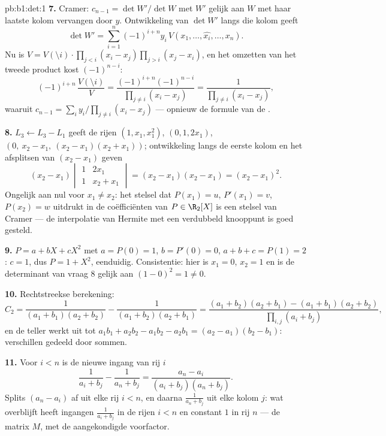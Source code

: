 \begin{solution}{pb:b1:det:1}
\textbf{7.} Cramer: $c_{n-1} = \det W'/\det W$ met $W'$ gelijk aan
$W$ met haar laatste kolom vervangen door $y$. Ontwikkeling van
$\det W'$ langs die kolom geeft
\[
\det W' = \sum_{i=1}^n (-1)^{i+n} y_i\,V(x_1, \dots, \widehat{x_i},
\dots, x_n) .
\]
Nu is $V = V(\setminus i)\cdot\prod_{j<i}(x_i - x_j)\prod_{j>i}
(x_j - x_i)$, en het omzetten van het tweede product kost
$(-1)^{n-i}$:
\[
(-1)^{i+n}\,\frac{V(\setminus i)}{V}
= \frac{(-1)^{i+n}(-1)^{n-i}}{\prod_{j\neq i}(x_i - x_j)}
= \frac{1}{\prod_{j\neq i}(x_i - x_j)} ,
\]
waaruit $c_{n-1} = \sum_i y_i/\prod_{j \neq i}(x_i - x_j)$ ---
opnieuw de formule van de .

\textbf{8.} $L_3 \leftarrow L_3 - L_1$ geeft de rijen $(1, x_1,
x_1^2)$, $(0, 1, 2x_1)$, $(0,\ x_2 - x_1,\
(x_2-x_1)(x_2+x_1))$; ontwikkeling langs de eerste kolom en het
afsplitsen van $(x_2 - x_1)$ geven
\[
(x_2 - x_1)\begin{vmatrix} 1 & 2x_1\\ 1 & x_2 + x_1
\end{vmatrix} = (x_2 - x_1)(x_2 - x_1) = (x_2 - x_1)^2 .
\]
Ongelijk aan nul voor $x_1 \neq x_2$: het  stelsel dat
$P(x_1) = u$, $P'(x_1) = v$, $P(x_2) = w$ uitdrukt in de
coëfficiënten van $P \in \R_2[X]$ is een stelsel van Cramer --- de
interpolatie van Hermite met een verdubbeld knooppunt is goed
gesteld.

\textbf{9.} $P = a + bX + cX^2$ met $a = P(0) = 1$, $b = P'(0) =
0$, $a + b + c = P(1) = 2$: $c = 1$, dus $P = 1 + X^2$, eenduidig.
Consistentie: hier is $x_1 = 0$, $x_2 = 1$ en is de determinant van
vraag 8 gelijk aan $(1 - 0)^2 = 1 \neq 0$.

\textbf{10.} Rechtstreekse berekening:
\[
C_2 = \frac{1}{(a_1+b_1)(a_2+b_2)} - \frac{1}{(a_1+b_2)(a_2+b_1)}
= \frac{(a_1+b_2)(a_2+b_1) - (a_1+b_1)(a_2+b_2)}
{\prod_{i,j}(a_i+b_j)} ,
\]
en de teller werkt uit tot $a_1b_1 + a_2b_2 - a_1b_2 - a_2b_1 =
(a_2 - a_1)(b_2 - b_1)$: verschillen gedeeld door sommen.

\textbf{11.} Voor $i < n$ is de nieuwe ingang van rij $i$
\[
\frac{1}{a_i + b_j} - \frac{1}{a_n + b_j}
= \frac{a_n - a_i}{(a_i + b_j)(a_n + b_j)} .
\]
Splits $(a_n - a_i)$ af uit elke rij $i < n$, en daarna
$\frac1{a_n + b_j}$ uit elke kolom $j$: wat overblijft heeft
ingangen $\frac1{a_i + b_j}$ in de rijen $i < n$ en constant $1$ in
rij $n$ --- de matrix $M$, met de aangekondigde voorfactor.


\end{solution}
